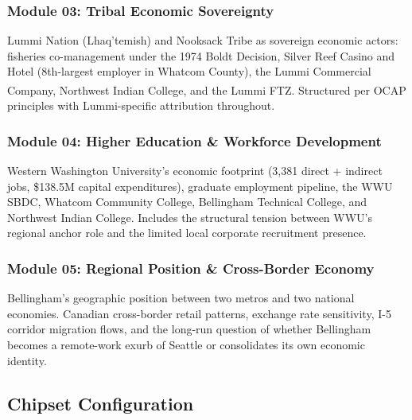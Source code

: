 \documentclass[11pt,letterpaper]{article}
\begin{document}
\subsubsection{Module 03: Tribal Economic Sovereignty}

Lummi Nation (Lhaq'temish) and Nooksack Tribe as sovereign economic actors: fisheries co-management under the 1974 Boldt Decision, Silver Reef Casino and Hotel (8th-largest employer in Whatcom County), the Lummi Commercial Company, Northwest Indian College, and the Lummi FTZ. Structured per OCAP\textsuperscript{\textregistered} principles with Lummi-specific attribution throughout.

\subsubsection{Module 04: Higher Education \& Workforce Development}

Western Washington University's economic footprint (3,381 direct + indirect jobs, \$138.5M capital expenditures), graduate employment pipeline, the WWU SBDC, Whatcom Community College, Bellingham Technical College, and Northwest Indian College. Includes the structural tension between WWU's regional anchor role and the limited local corporate recruitment presence.

\subsubsection{Module 05: Regional Position \& Cross-Border Economy}

Bellingham's geographic position between two metros and two national economies. Canadian cross-border retail patterns, exchange rate sensitivity, I-5 corridor migration flows, and the long-run question of whether Bellingham becomes a remote-work exurb of Seattle or consolidates its own economic identity.

\subsection{Chipset Configuration}
\end{document}
